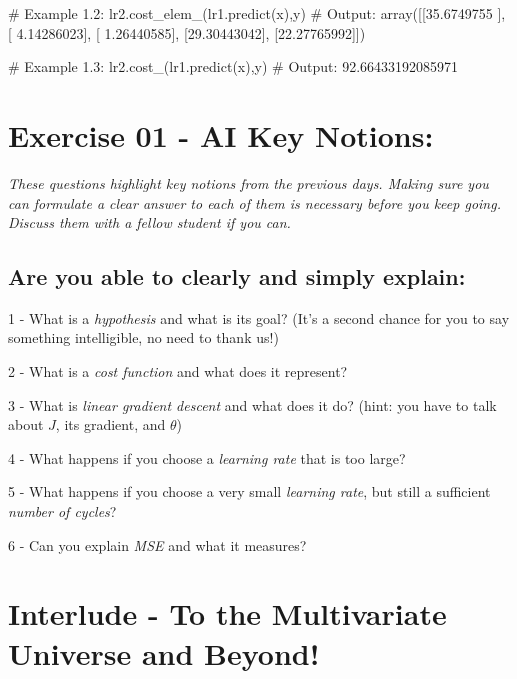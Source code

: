 \documentclass[]{article}
\newenvironment{Shaded}{\begin{snugshade}}{\end{snugshade}}
\newcommand{\CommentTok}[1]{\textcolor[rgb]{0.48,0.49,0.49}{#1}}
\newcommand{\FloatTok}[1]{\textcolor[rgb]{0.96,0.45,0.00}{#1}}
\newcommand{\NormalTok}[1]{\textcolor[rgb]{0.81,0.81,0.76}{#1}}
\begin{document}
\begin{Shaded}
\begin{Highlighting}[]
\CommentTok{# Example 1.2:}
\NormalTok{lr2.cost_elem_(lr1.predict(x),y)}
\CommentTok{# Output:}
\NormalTok{array([[}\FloatTok{35.6749755}\NormalTok{ ],}
\NormalTok{       [ }\FloatTok{4.14286023}\NormalTok{],}
\NormalTok{       [ }\FloatTok{1.26440585}\NormalTok{],}
\NormalTok{       [}\FloatTok{29.30443042}\NormalTok{],}
\NormalTok{       [}\FloatTok{22.27765992}\NormalTok{]])}

\CommentTok{# Example 1.3:}
\NormalTok{lr2.cost_(lr1.predict(x),y)}
\CommentTok{# Output:}
\FloatTok{92.66433192085971}
\end{Highlighting}
\end{Shaded}

\clearpage

\hypertarget{exercise-01---ai-key-notions-1}{%
\section{Exercise 01 - AI Key
Notions:}\label{exercise-01---ai-key-notions-1}}

\emph{These questions highlight key notions from the previous days.
Making sure you can formulate a clear answer to each of them is
necessary before you keep going. Discuss them with a fellow student if
you can.}

\hypertarget{are-you-able-to-clearly-and-simply-explain}{%
\subsection{Are you able to clearly and simply
explain:}\label{are-you-able-to-clearly-and-simply-explain}}

1 - What is a \emph{hypothesis} and what is its goal? (It's a second
chance for you to say something intelligible, no need to thank us!)

2 - What is a \emph{cost function} and what does it represent?

3 - What is \emph{linear gradient descent} and what does it do? (hint:
you have to talk about \(J\), its gradient, and \(\theta\))

4 - What happens if you choose a \emph{learning rate} that is too large?

5 - What happens if you choose a very small \emph{learning rate}, but
still a sufficient \emph{number of cycles}?

6 - Can you explain \emph{MSE} and what it measures?

\clearpage

\hypertarget{interlude---to-the-multivariate-universe-and-beyond-1}{%
\section{Interlude - To the Multivariate Universe and
Beyond!}\label{interlude---to-the-multivariate-universe-and-beyond-1}}
\end{document}
